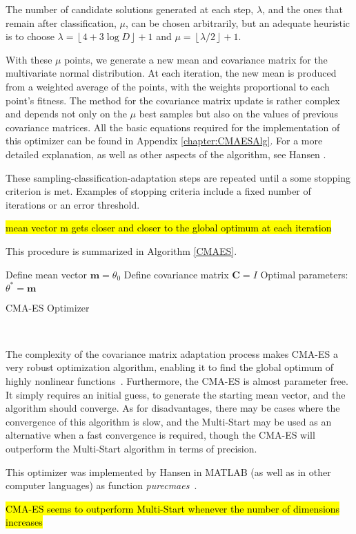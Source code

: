 The number of candidate solutions generated at each step, $\lambda$, and the ones that remain after classification, $\mu$, can be chosen arbitrarily, but an adequate heuristic is to choose $\lambda=\left\lfloor4+3\log D\right\rfloor+1$ and $\mu=\left\lfloor\lambda/2\right\rfloor+1$.

With these $\mu$ points, we generate a new mean and covariance matrix for the multivariate normal distribution.
At each iteration, the new mean is produced from a weighted average of the points, with the weights proportional to each point's fitness.
The method for the covariance matrix update is rather complex and depends not only on the $\mu$ best samples but also on the values of previous covariance matrices. All the basic equations required for the implementation of this optimizer can be found in Appendix \ref{chapter:CMAESAlg}. For a more detailed explanation, as well as other aspects of the algorithm, see Hansen \cite{Hansen}.

These sampling-classification-adaptation steps are repeated until a some stopping criterion is met. Examples of stopping criteria include a fixed number of iterations or an error threshold.

\hl{mean vector m gets closer and closer to the global optimum at each iteration}

This procedure is summarized in Algorithm \ref{CMAES}.

\begin{algorithm}[H]\label{CMAES}
\DontPrintSemicolon
Define mean vector $\mathbf{m}=\theta_0$
Define covariance matrix $\mathbf{C}=I$\;
 Optimal parameters: $\theta^{*}=\mathbf{m}$\;
 \caption{CMA-ES Optimizer}
\end{algorithm}
\

The complexity of the covariance matrix adaptation process makes CMA-ES a very robust optimization algorithm, enabling it to find the global optimum of highly nonlinear functions~\cite{DilaoCMA}.
Furthermore, the CMA-ES is almost parameter free. It simply requires an initial guess, to generate the starting mean vector, and the algorithm should converge.
As for disadvantages, there may be cases where the convergence of this algorithm is slow, and the Multi-Start may be used as an alternative when a fast convergence is required, though the CMA-ES will outperform the Multi-Start algorithm in terms of precision.

This optimizer was implemented by Hansen in MATLAB (as well as in other computer languages) as function \emph{purecmaes}~\cite{CMAES}.



\hl{CMA-ES seems to outperform Multi-Start whenever the number of dimensions increases}

